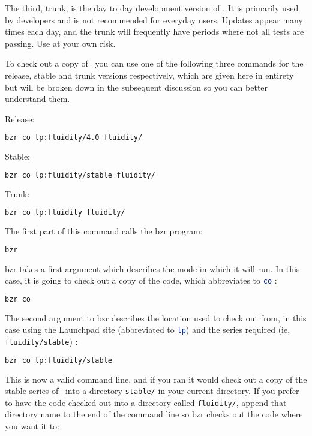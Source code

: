 The third, trunk, is the day to day development version of \fluidity. It is
primarily used by developers and is not recommended for everyday users. Updates
appear many times each day, and the trunk will frequently have periods where
not all tests are passing. Use at your own risk.

To check out a copy of \fluidity\ you can use one of the following three
commands for the release, stable and trunk versions respectively, which 
are given here in entirety but will be broken down in the subsequent 
discussion so you can better understand them.

Release:
\begin{lstlisting}[language=Bash]
bzr co lp:fluidity/4.0 fluidity/
\end{lstlisting}

Stable:
\begin{lstlisting}[language=Bash]
bzr co lp:fluidity/stable fluidity/
\end{lstlisting}

Trunk:
\begin{lstlisting}[language=Bash]
bzr co lp:fluidity fluidity/
\end{lstlisting}

The first part of this command calls the bzr program:

\begin{lstlisting}[language=Bash]
bzr
\end{lstlisting}

bzr takes a first argument which describes the mode in which it will run. In
this case, it is going to check out a copy of the code, which abbreviates to
\lstinline[language=Bash]+co+ :

\begin{lstlisting}[language=Bash]
bzr co
\end{lstlisting}

The second argument to bzr describes the location used to check out \fluidity
from, in this case using the Launchpad site (abbreviated to
\lstinline[language=Bash]+lp+) and the series required (ie,
\lstinline[language=Bash]+fluidity/stable+) :



\begin{lstlisting}[language=Bash]
bzr co lp:fluidity/stable
\end{lstlisting}

This is now a valid command line, and if you ran it would check out a copy of
the stable series of \fluidity\ into a directory
\lstinline[language=Bash]+stable/+ in your current directory. If you
prefer to have the code checked out into a directory called
\lstinline[language=Bash]+fluidity/+, append that directory name to the end of
the command line so bzr checks out the code where you want it to:

